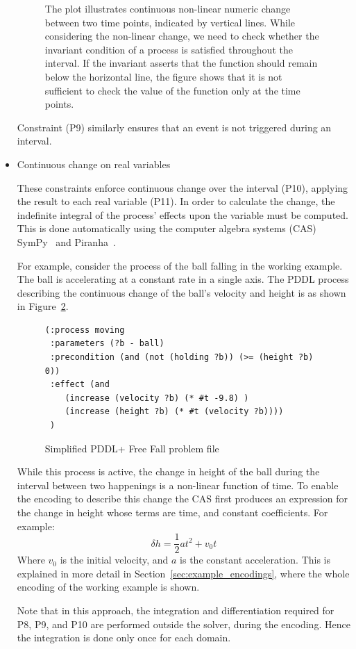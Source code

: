 \begin{itemize}
\begin{figure}[htb!]
\center

\caption{The plot illustrates continuous non-linear numeric change between two time points, indicated by vertical lines. While considering the non-linear change, we need to check whether the invariant condition of a process is satisfied throughout the interval. If the invariant asserts that the function should remain below the horizontal line, the figure shows that it is not sufficient to check the value of the function only at the time points.}
\label{fig:Zero_cross}
\end{figure}

Constraint (P9) similarly ensures that an event is not triggered during an interval.

\item Continuous change on real variables

These constraints enforce continuous change over the interval (P10), applying the result to each real variable (P11). In order to calculate the change, the indefinite integral of the process' effects upon the variable must be computed. This is done automatically using the computer algebra systems (CAS) SymPy~\cite{sympy} and Piranha~\cite{bis18}.

For example, consider the process of the ball falling in the working example. The ball is accelerating at a constant rate in a single axis. The PDDL process describing the continuous change of the ball's velocity and height is as shown in Figure~\ref{fig:ballproc}.

\begin{figure}[htb!]
\small
\centering
\begin{BVerbatim}
(:process moving
 :parameters (?b - ball)
 :precondition (and (not (holding ?b)) (>= (height ?b) 0))
 :effect (and
    (increase (velocity ?b) (* #t -9.8) )
    (increase (height ?b) (* #t (velocity ?b))))
 )
\end{BVerbatim}
\caption{Simplified PDDL+ Free Fall problem file}
\label{fig:ballproc}
\end{figure}

While this process is active, the change in height of the ball during the interval between two happenings is a non-linear function of time. To enable the encoding to describe this change the CAS first produces an expression for the change in height whose terms are time, and constant coefficients. For example:
$$
\delta h = \frac{1}{2} {at^{2}} + {v_0}t
$$
Where $v_0$ is the initial velocity, and $a$ is the constant acceleration. This is explained in more detail in Section~\ref{sec:example_encodings}, where the whole encoding of the working example is shown.

Note that in this approach, the integration and differentiation required for P8, P9, and P10 are performed outside the solver, during the encoding. Hence the integration is done only once for each domain.
\end{itemize}

